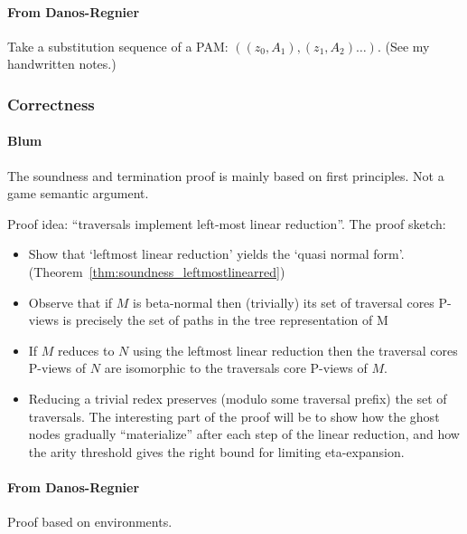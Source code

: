 \documentclass{article}
\theoremstyle{definition}
\begin{document}
\paragraph{From Danos-Regnier}

Take a substitution sequence of a PAM: $((z_0,A_1), (z_1,A_2) \ldots )$.
(See my handwritten notes.)

\subsubsection{Correctness}
\paragraph{Blum}
The soundness and termination proof is mainly based on first principles. Not a game semantic argument.

Proof idea: ``traversals implement left-most linear reduction''.
The proof sketch:
\begin{itemize}
\item Show that `leftmost linear reduction' yields the `quasi normal form'.  (Theorem~\ref{thm:soundness_leftmostlinearred})
\item Observe that if $M$ is beta-normal then (trivially) its set of traversal cores P-views is precisely the set of paths in the tree representation of M
\item If $M$ reduces to $N$ using the leftmost linear reduction then the traversal cores P-views of $N$ are isomorphic to the traversals core P-views of $M$.
\item Reducing a trivial redex preserves (modulo some traversal prefix) the set of traversals.
The interesting part of the proof will be to show how the ghost nodes gradually ``materialize'' after each step of the linear reduction, and how the arity threshold gives the right bound for limiting eta-expansion.
\end{itemize}

\paragraph{From Danos-Regnier}
Proof based on environments.



\end{document}
